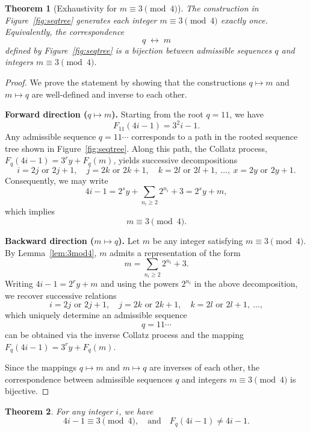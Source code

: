 \documentclass{amsart}
\newtheorem{theorem}{Theorem}[section]
\theoremstyle{definition}
\theoremstyle{remark}
\numberwithin{equation}{section}
\begin{document}
\begin{theorem}[Exhaustivity for $m \equiv 3 \pmod{4}$]\label{thm:exhaustive}
	The construction in Figure~\ref{fig:seqtree} generates each integer
	$m \equiv 3 \pmod{4}$ exactly once. Equivalently, the correspondence
	\[
	q \;\longleftrightarrow\; m
	\]
	defined by Figure~\ref{fig:seqtree} is a bijection between admissible sequences $q$
	and integers $m \equiv 3 \pmod{4}$.
\end{theorem}

\begin{proof}
	We prove the statement by showing that the constructions
	$q \mapsto m$ and $m \mapsto q$ are well-defined and inverse to each other.
	
	\medskip
	\noindent\textbf{Forward direction ($q \mapsto m$).}
	Starting from the root $q = 11$, we have
	\[
	F_{11}(4i - 1) = 3^{2} i - 1.
	\]
	Any admissible sequence $q = 11\cdots$ corresponds to a path in the rooted
	sequence tree shown in Figure~\ref{fig:seqtree}. Along this path, the Collatz
	process, $F_q(4i - 1)=3^ry+F_q(m)$, yields successive decompositions
	\[
	i = 2j \text{ or } 2j + 1,\quad
	j = 2k \text{ or } 2k + 1,\quad
	k = 2l \text{ or } 2l + 1,\ \ldots,\ 
	x = 2y \text{ or } 2y + 1.
	\]
	Consequently, we may write
	\[
	4i - 1 = 2^{s} y + \sum_{n_i \ge 2} 2^{n_i} + 3
	= 2^{s} y + m,
	\]
	which implies
	\[
	m \equiv 3 \pmod{4}.
	\]
	
	\medskip
	\noindent\textbf{Backward direction ($m \mapsto q$).}
	Let $m$ be any integer satisfying $m \equiv 3 \pmod{4}$. By
	Lemma~\ref{lem:3mod4}, $m$ admits a representation of the form
	\[
	m = \sum_{n_i \ge 2} 2^{n_i} + 3.
	\]
	Writing $4i - 1 = 2^ry + m$ and using the powers $2^{n_i}$ in the above decomposition,
	we recover successive relations
	\[
	i = 2j \text{ or } 2j + 1,\quad
	j = 2k \text{ or } 2k + 1,\quad
	k = 2l \text{ or } 2l + 1,\ \ldots,
	\]
	which uniquely determine an admissible sequence
	\[
	q = 11\cdots
	\]
	can be obtained via the inverse Collatz process and the mapping $F_q(4i - 1)=3^ry+F_q(m)$.
	
	\medskip
	Since the mappings $q \mapsto m$ and $m \mapsto q$ are inverses of each other,
	the correspondence between admissible sequences $q$ and integers
	$m \equiv 3 \pmod{4}$ is bijective.
\end{proof}


\begin{theorem}\label{thm:exhaustive}
	For any integer $i$, we have
	\[
	4i - 1 \equiv 3 \pmod{4}, \quad \text{and} \quad F_q(4i - 1) \neq 4i - 1.
	\]
\end{theorem}
\end{document}
